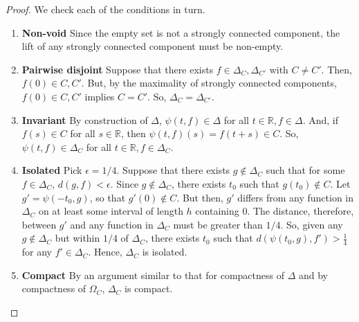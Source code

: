 \documentclass[11pt]{article}
\begin{document}
\begin{proof}
We check each of the conditions in turn.
\begin{enumerate}
\item \textbf{Non-void}
Since the empty set is not a strongly connected component, the lift of any strongly connected component must be non-empty.
\item \textbf{Pairwise disjoint}
Suppose that there exists $f \in \Delta_C, \Delta_{C'}$ with $C \neq C'$.  Then, $f(0) \in C, C'$.  But, by the maximality of strongly connected components, $f(0) \in C, C'$ implies $C = C'$.  So, $\Delta_{C} = \Delta_{C'}$.
\item \textbf{Invariant}
By construction of $\Delta$, $\psi(t,f) \in \Delta$ for all $t \in \mathbb{R}, f \in \Delta$.  And, if $f(s) \in C$ for all $s \in \mathbb{R}$, then $\psi(t,f)(s) = f(t+s) \in C$.  So, $\psi(t,f) \in \Delta_C$ for all $t \in \mathbb{R}, f \in \Delta_C$.
\item \textbf{Isolated}
Pick $\epsilon = 1/4$.  Suppose that there exists $g \notin \Delta_C$ such that for some $f \in \Delta_C$, $d(g,f) < \epsilon$.  Since $g \notin \Delta_C$, there exists $t_0$ such that $g(t_0) \notin C$.  Let $g' = \psi(-t_0,g)$, so that $g'(0) \notin C$.  But then, $g'$ differs from any function in $\Delta_C$ on at least some interval of length $h$ containing $0$.  The distance, therefore, between $g'$ and any function in $\Delta_C$ must be greater than $1/4$.  So, given any $g \notin \Delta_C$ but within $1/4$ of $\Delta_C$, there exists $t_0$ such that $d(\psi(t_0, g),f') > \frac{1}{4}$ for any $f' \in \Delta_C$.  Hence, $\Delta_C$ is isolated.  
\item \textbf{Compact}
By an argument similar to that for compactness of $\Delta$ and by compactness of $\Omega_C$, $\Delta_C$ is compact.




\end{enumerate}
\end{proof}
\end{document}
